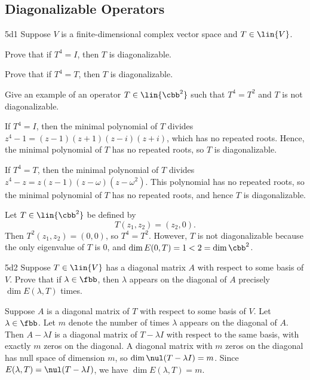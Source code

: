 \subsection{Diagonalizable Operators}

\begin{exercise}{5d1}
    Suppose $V$ is a finite-dimensional complex vector space and $T \in \lin{V}$.
    \begin{subexercises}
        \item Prove that if $T^4 = I$, then $T$ is diagonalizable.
        \item Prove that if $T^4 = T$, then $T$ is diagonalizable.
        \item Give an example of an operator $T \in \lin{\cbb^2}$ such that $T^4 = T^2$ and $T$ is not diagonalizable.
    \end{subexercises}
\end{exercise}

\begin{solenum}
    \item If $T^4 = I$, then the minimal polynomial of $T$ divides $z^4 - 1 = (z - 1)(z + 1)(z - i)(z + i)$, which has no repeated roots. Hence, the minimal polynomial of $T$ has no repeated roots, so $T$ is diagonalizable.
    \item If $T^4 = T$, then the minimal polynomial of $T$ divides $z^4 - z = z(z - 1)(z - \omega)(z - \omega^2)$. This polynomial has no repeated roots, so the minimal polynomial of $T$ has no repeated roots, and hence $T$ is diagonalizable.
    \item Let $T \in \lin{\cbb^2}$ be defined by
    \[
        T(z_1, z_2) = (z_2, 0).
    \]
    Then $T^2(z_1, z_2) = (0, 0)$, so $T^4 = T^2$. However, $T$ is not diagonalizable because the only eigenvalue of $T$ is $0$, and $\dim E(0, T) = 1 < 2 = \dim \cbb^2$.
\end{solenum}

\begin{exercise}{5d2}
    Suppose $T \in \lin{V}$ has a diagonal matrix $A$ with respect to some basis of $V$.
    Prove that if $\lambda \in \fbb$, then $\lambda$ appears on the diagonal of $A$ precisely $\dim E(\lambda, T)$ times.
\end{exercise}

\begin{sol}
    Suppose $A$ is a diagonal matrix of $T$ with respect to some basis of $V$.
    Let $\lambda \in \fbb$.
    Let $m$ denote the number of times $\lambda$ appears on the diagonal of $A$.
    Then $A - \lambda I$ is a diagonal matrix of $T - \lambda I$ with respect to the same basis, with exactly $m$ zeros on the diagonal.
    A diagonal matrix with $m$ zeros on the diagonal has null space of dimension $m$, so $\dim \nul(T - \lambda I) = m$.
    Since $E(\lambda, T) = \nul(T - \lambda I)$, we have $\dim E(\lambda, T) = m$.
\end{sol}

